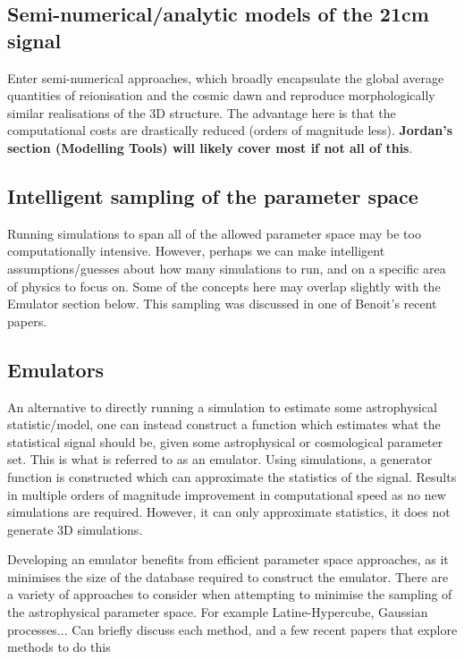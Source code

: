 \subsection{Semi-numerical/analytic models of the 21cm signal}

Enter semi-numerical approaches, which broadly encapsulate the global average quantities of reionisation and the cosmic dawn and reproduce morphologically similar realisations of the 3D structure. The advantage here is that the computational costs are drastically reduced (orders of magnitude less). \textbf{Jordan's section (Modelling Tools) will likely cover most if not all of this}.

\subsection{Intelligent sampling of the parameter space}

Running simulations to span all of the allowed parameter space may be too computationally intensive. However, perhaps we can make intelligent assumptions/guesses about how many simulations to run, and on a specific area of physics to focus on. Some of the concepts here may overlap slightly with the Emulator section below. This sampling was discussed in one of Benoit's recent papers.

\subsection{Emulators}

An alternative to directly running a simulation to estimate some astrophysical statistic/model, one can instead construct a function which estimates what the statistical signal should be, given some astrophysical or cosmological parameter set. This is what is referred to as an emulator. Using simulations, a generator function is constructed which can approximate the statistics of the signal. Results in multiple orders of magnitude improvement in computational speed as no new simulations are required. However, it can only approximate statistics, it does not generate 3D simulations. 

Developing an emulator benefits from efficient parameter space approaches, as it minimises the size of the database required to construct the emulator. There are a variety of approaches to consider when attempting to minimise the sampling of the astrophysical parameter space. For example Latine-Hypercube, Gaussian processes... Can briefly discuss each method, and a few recent papers that explore methods to do this

